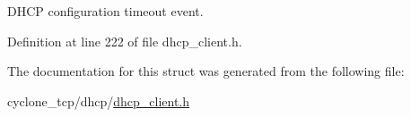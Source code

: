 D\+H\+CP configuration timeout event. 



Definition at line 222 of file dhcp\+\_\+client.\+h.



The documentation for this struct was generated from the following file\+:\begin{DoxyCompactItemize}
\item 
cyclone\+\_\+tcp/dhcp/\hyperlink{dhcp__client_8h}{dhcp\+\_\+client.\+h}\end{DoxyCompactItemize}
